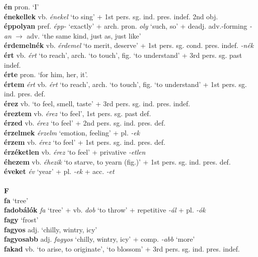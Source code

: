 \documentclass[11pt]{article}
\begin{document}
\textbf{én} pron. `I' \\
\textbf{énekellek} vb. \emph{énekel} `to sing' + 1st
pers. sg. ind. pres. indef. 2nd obj. \\
\textbf{éppolyan} pref. \emph{épp-} `exactly' + arch. pron. \emph{oly}
`such, so' + deadj. adv.\hyp{}forming \emph{-an} $\rightarrow$ adv. `the
same kind, just as, just like' \\
\textbf{érdemelnék} vb. \emph{érdemel} `to merit, deserve' + 1st
pers. sg. cond. pres. indef. \emph{-nék} \\
\textbf{ért} vb. \emph{ért} `to reach', arch. `to touch', fig. `to
understand' + 3rd pers. sg. past indef. \\
\textbf{érte} pron. `for him, her, it'. \\
\textbf{értem} \emph{ért} vb. \emph{ért} `to reach', arch. `to touch',
fig. `to understand' + 1st pers. sg. ind. pres. def. \\
\textbf{érez} vb. `to feel, smell, taste' + 3rd
pers. sg. ind. pres. indef. \\
\textbf{éreztem} vb. \emph{érez} `to feel', 1st pers. sg. past def. \\
\textbf{érzed} vb. \emph{érez} `to feel' + 2nd
pers. sg. ind. pres. def. \\
\textbf{érzelmek} \emph{érzelm} `emotion, feeling' + pl. \emph{-ek} \\
\textbf{érzem} vb. \emph{érez} `to feel' + 1st
pers. sg. ind. pres. def. \\
\textbf{érzéketlen} vb. \emph{érez} `to feel' +
privative \emph{-etlen} \\
\textbf{éhezem} vb. \emph{éhezik} `to starve, to yearn (fig.)' + 1st
pers. sg. ind. pres. def. \\
\textbf{éveket} \emph{év} `year' + pl. \emph{-ek} + acc. \emph{-et} \\
\ \\
\noindent \textbf{\large F} \\
\textbf{fa} `tree' \\
\textbf{fadobálók} \emph{fa} `tree' + vb. \emph{dob} `to throw' +
repetitive \emph{-ál} + pl. \emph{-ók} \\
\textbf{fagy} `frost' \\
\textbf{fagyos} adj. `chilly, wintry, icy' \\
\textbf{fagyosabb} adj. \emph{fagyos} `chilly, wintry, icy' +
comp. \emph{-abb} `more' \\
\textbf{fakad} vb. `to arise, to originate', `to blossom' + 3rd
pers. sg. ind. pres. indef. \\
\end{document}
